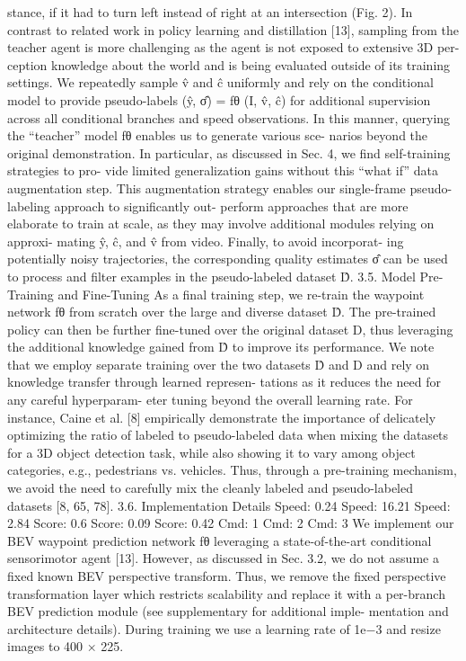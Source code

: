 \documentclass[letterpaper, 12pt]{article}
\theoremstyle{definition}
\theoremstyle{definition}
\theoremstyle{definition}
\theoremstyle{definition}
\theoremstyle{definition}
\begin{document}
stance, if it had to turn left instead of right at an intersection
(Fig. 2). In contrast to related work in policy learning and
distillation [13], sampling from the teacher agent is more
challenging as the agent is not exposed to extensive 3D per-
ception knowledge about the world and is being evaluated
outside of its training settings.
We repeatedly sample v̂ and ĉ uniformly and rely on
the conditional model to provide pseudo-labels (ŷ, σ̂) =
fθ (I, v̂, ĉ) for additional supervision across all conditional
branches and speed observations. In this manner, querying
the “teacher” model fθ enables us to generate various sce-
narios beyond the original demonstration. In particular, as
discussed in Sec. 4, we find self-training strategies to pro-
vide limited generalization gains without this “what if” data
augmentation step. This augmentation strategy enables our
single-frame pseudo-labeling approach to significantly out-
perform approaches that are more elaborate to train at scale,
as they may involve additional modules relying on approxi-
mating ŷ, ĉ, and v̂ from video. Finally, to avoid incorporat-
ing potentially noisy trajectories, the corresponding quality
estimates σ̂ can be used to process and filter examples in
the pseudo-labeled dataset D̂.
3.5. Model Pre-Training and Fine-Tuning
As a final training step, we re-train the waypoint network
fθ from scratch over the large and diverse dataset D̂. The
pre-trained policy can then be further fine-tuned over the
original dataset D, thus leveraging the additional knowledge
gained from D̂ to improve its performance. We note that
we employ separate training over the two datasets D̂ and D
and rely on knowledge transfer through learned represen-
tations as it reduces the need for any careful hyperparam-
eter tuning beyond the overall learning rate. For instance,
Caine et al. [8] empirically demonstrate the importance of
delicately optimizing the ratio of labeled to pseudo-labeled
data when mixing the datasets for a 3D object detection
task, while also showing it to vary among object categories,
e.g., pedestrians vs. vehicles. Thus, through a pre-training
mechanism, we avoid the need to carefully mix the cleanly
labeled and pseudo-labeled datasets [8, 65, 78].
3.6. Implementation Details
Speed: 0.24 Speed: 16.21 Speed: 2.84
Score: 0.6 Score: 0.09 Score: 0.42
Cmd: 1
Cmd: 2
Cmd: 3
We implement our BEV waypoint prediction network
fθ leveraging a state-of-the-art conditional sensorimotor
agent [13]. However, as discussed in Sec. 3.2, we do not
assume a fixed known BEV perspective transform. Thus,
we remove the fixed perspective transformation layer which
restricts scalability and replace it with a per-branch BEV
prediction module (see supplementary for additional imple-
mentation and architecture details). During training we use
a learning rate of 1e−3 and resize images to 400 × 225.
\end{document}
